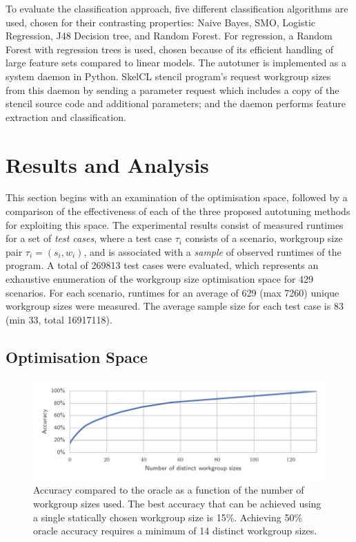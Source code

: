 \documentclass[nonatbib,preprint,10pt]{sigplanconf}
\begin{document}
To evaluate the classification approach, five different classification
algorithms are used, chosen for their contrasting properties: Naive
Bayes, SMO, Logistic Regression, J48 Decision tree, and Random
Forest. For regression, a Random Forest with regression trees is used,
chosen because of its efficient handling of large feature sets
compared to linear models. The autotuner is implemented as a system
daemon in Python. SkelCL stencil program's request workgroup sizes
from this daemon by sending a parameter request which includes a copy
of the stencil source code and additional parameters; and the daemon
performs feature extraction and classification.


\section{Results and Analysis}

This section begins with an examination of the optimisation space,
followed by a comparison of the effectiveness of each of the three
proposed autotuning methods for exploiting this space. The
experimental results consist of measured runtimes for a set of
\emph{test cases}, where a test case $\tau_i$ consists of a scenario,
workgroup size pair $\tau_i = (s_i,w_i)$, and is associated with a
\emph{sample} of observed runtimes of the program. A total of 269813
test cases were evaluated, which represents an exhaustive enumeration
of the workgroup size optimisation space for 429 scenarios. For each
scenario, runtimes for an average of 629 (max 7260) unique workgroup
sizes were measured. The average sample size for each test case is 83
(min 33, total 16917118).


\subsection{Optimisation Space}

\begin{figure}
\centering
\includegraphics[width=\columnwidth]{img/num_params_oracle.pdf}
\caption[Oracle accuracy vs.\ number of workgroup sizes]{%
  Accuracy compared to the oracle as a function of the number of
  workgroup sizes used. The best accuracy that can be achieved using a
  single statically chosen workgroup size is 15\%. Achieving 50\%
  oracle accuracy requires a minimum of 14 distinct workgroup sizes.%
}
\label{fig:oracle-accuracy}
\end{figure}
\end{document}
